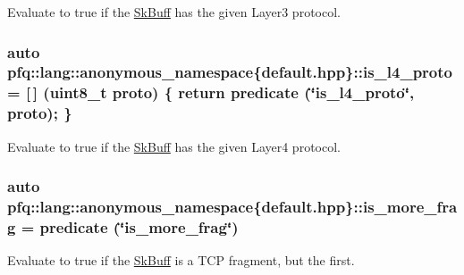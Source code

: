 Evaluate to {\ttfamily true} if the \hyperlink{structpfq_1_1lang_1_1SkBuff}{Sk\+Buff} has the given Layer3 protocol. 

\subsubsection[{\texorpdfstring{is\+\_\+l4\+\_\+proto}{is_l4_proto}}]{\setlength{\rightskip}{0pt plus 5cm}auto pfq\+::lang\+::anonymous\+\_\+namespace\{default.\+hpp\}\+::is\+\_\+l4\+\_\+proto = \mbox{[}$\,$\mbox{]} (uint8\+\_\+t proto) \{ return {\bf predicate} (\char`\"{}is\+\_\+l4\+\_\+proto\char`\"{}, proto); \}}\hypertarget{namespacepfq_1_1lang_1_1anonymous__namespace_02default_8hpp_03_a9d06d4dedca1ebdc3b270cb2f3e9e42b}{}\label{namespacepfq_1_1lang_1_1anonymous__namespace_02default_8hpp_03_a9d06d4dedca1ebdc3b270cb2f3e9e42b}


Evaluate to {\ttfamily true} if the \hyperlink{structpfq_1_1lang_1_1SkBuff}{Sk\+Buff} has the given Layer4 protocol. 

\subsubsection[{\texorpdfstring{is\+\_\+more\+\_\+frag}{is_more_frag}}]{\setlength{\rightskip}{0pt plus 5cm}auto pfq\+::lang\+::anonymous\+\_\+namespace\{default.\+hpp\}\+::is\+\_\+more\+\_\+frag = {\bf predicate} (\char`\"{}is\+\_\+more\+\_\+frag\char`\"{})}\hypertarget{namespacepfq_1_1lang_1_1anonymous__namespace_02default_8hpp_03_a0b169afb2f21c8626f06f77ca75feded}{}\label{namespacepfq_1_1lang_1_1anonymous__namespace_02default_8hpp_03_a0b169afb2f21c8626f06f77ca75feded}


Evaluate to {\ttfamily true} if the \hyperlink{structpfq_1_1lang_1_1SkBuff}{Sk\+Buff} is a T\+CP fragment, but the first. 

